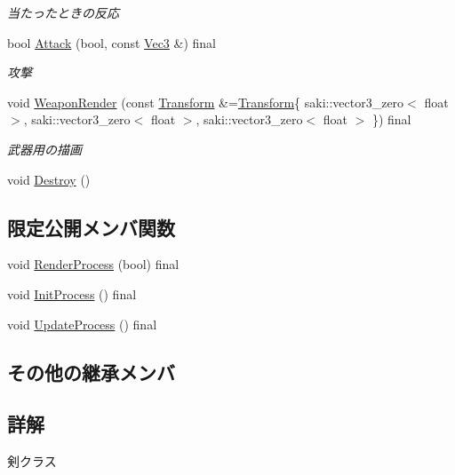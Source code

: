 \begin{DoxyCompactItemize}
\begin{DoxyCompactList}\small\item\em 当たったときの反応 \end{DoxyCompactList}\item 
bool \mbox{\hyperlink{class_sword_a6c8642e6a8f1d6152abce6c84bf6d21b}{Attack}} (bool, const \mbox{\hyperlink{common_8h_ab1cb35b3a17c398d8ef71d5f779808bf}{Vec3}} \&) final
\begin{DoxyCompactList}\small\item\em 攻撃 \end{DoxyCompactList}\item 
void \mbox{\hyperlink{class_sword_ac80e3b54ef5572eae1e4760d14383f4f}{Weapon\+Render}} (const \mbox{\hyperlink{common_8h_a1c43cb8f0d8a41901f3ce4c67dbbce20}{Transform}} \&=\mbox{\hyperlink{common_8h_a1c43cb8f0d8a41901f3ce4c67dbbce20}{Transform}}\{ saki\+::vector3\+\_\+zero$<$ float $>$, saki\+::vector3\+\_\+zero$<$ float $>$, saki\+::vector3\+\_\+zero$<$ float $>$ \}) final
\begin{DoxyCompactList}\small\item\em 武器用の描画 \end{DoxyCompactList}\item 
void \mbox{\hyperlink{class_sword_a8473b694775374df4d9b6305cfa82293}{Destroy}} ()
\end{DoxyCompactItemize}
\subsection*{限定公開メンバ関数}
\begin{DoxyCompactItemize}
\item 
void \mbox{\hyperlink{class_sword_a7f5d2c6e6e0104e9a85f600eec14ef6d}{Render\+Process}} (bool) final
\item 
void \mbox{\hyperlink{class_sword_aab0c07888f3aaee1ba25d668ac7c847a}{Init\+Process}} () final
\item 
void \mbox{\hyperlink{class_sword_a3e0221aa5c05ecada9def39fb38c0059}{Update\+Process}} () final
\end{DoxyCompactItemize}
\subsection*{その他の継承メンバ}


\subsection{詳解}
剣クラス 

